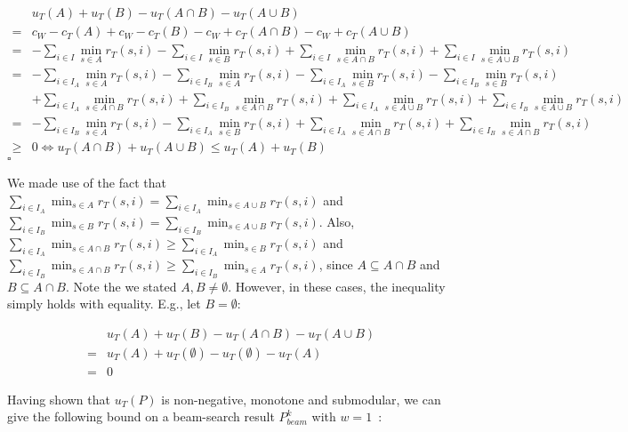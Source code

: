 \documentclass[conference]{IEEEtran}
\begin{document}
\begin{align*}
	& u_{T}(A) + u_{T}(B) - u_{T}(A \cap B) - u_{T}(A \cup B)\\
	= & c_W - c_{T}(A) + c_W - c_{T}(B) - c_W + c_{T}(A \cap B) - c_W + c_{T}(A \cup B)\\
	= & - \sum_{i \in I}{\min_{s \in A}{r_T(s,i)}} - \sum_{i \in I}{\min_{s \in B}{r_T(s,i)}} + \sum_{i \in I}{\min_{s \in A \cap B}{r_T(s,i)}} + \sum_{i \in I}{\min_{s \in A \cup B}{r_T(s,i)}}\\
	= & - \sum_{i \in I_A}{\min_{s \in A}{r_T(s,i)}} - \sum_{i \in I_B}{\min_{s \in A}{r_T(s,i)}} - \sum_{i \in I_A}{\min_{s \in B}{r_T(s,i)}} - \sum_{i \in I_B}{\min_{s \in B}{r_T(s,i)}}\\
	& + \sum_{i \in I_A}{\min_{s \in A \cap B}{r_T(s,i)}} + \sum_{i \in I_B}{\min_{s \in A \cap B}{r_T(s,i)}} + \sum_{i \in I_A}{\min_{s \in A \cup B}{r_T(s,i)}} + \sum_{i \in I_B}{\min_{s \in A \cup B}{r_T(s,i)}}\\
	= & - \sum_{i \in I_B}{\min_{s \in A}{r_T(s,i)}} - \sum_{i \in I_A}{\min_{s \in B}{r_T(s,i)}} + \sum_{i \in I_A}{\min_{s \in A \cap B}{r_T(s,i)}} + \sum_{i \in I_B}{\min_{s \in A \cap B}{r_T(s,i)}}\\
	\geq & 0 \Leftrightarrow u_{T}(A \cap B) + u_{T}(A \cup B) \leq u_{T}(A) + u_{T}(B)
\end{align*}\hfill$\square$

We made use of the fact that $\sum_{i \in I_A}{\min_{s \in A}{r_T(s,i)}} = \sum_{i \in I_A}{\min_{s \in A \cup B}{r_T(s,i)}}$ and $\sum_{i \in I_B}{\min_{s \in B}{r_T(s,i)}} = \sum_{i \in I_B}{\min_{s \in A \cup B}{r_T(s,i)}}$.
Also, $\sum_{i \in I_A}{\min_{s \in A \cap B}{r_T(s,i)}} \geq \sum_{i \in I_A}{\min_{s \in B}{r_T(s,i)}}$ and $\sum_{i \in I_B}{\min_{s \in A \cap B}{r_T(s,i)}} \geq \sum_{i \in I_B}{\min_{s \in A}{r_T(s,i)}}$, since $A \subseteq A \cap B$ and $B \subseteq A \cap B$.
Note the we stated $A,B \neq \emptyset$.
However, in these cases, the inequality simply holds with equality.
E.g., let $B = \emptyset$:

\begin{align*}
	& u_{T}(A) + u_{T}(B) - u_{T}(A \cap B) - u_{T}(A \cup B)\\
	= & u_{T}(A) + u_{T}(\emptyset) - u_{T}(\emptyset) - u_{T}(A)\\
	= & 0
\end{align*}

Having shown that $u_{T}(P)$ is non-negative, monotone and submodular, we can give the following bound on a beam-search result $P_{beam}^k$ with $w=1$~\cite{nemhauser1978analysis, krause2014submodular}:
\end{document}
